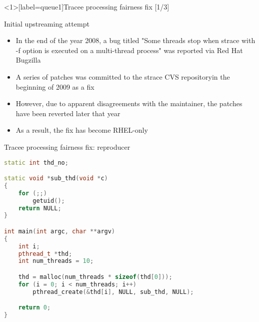 \documentclass[unicode,aspectratio=169]{beamer}
\begin{document}
\begin{frame}<1>[label=queue1]{Tracee processing fairness fix \hfill [1/3]}
\begin{block}{\large Initial upstreaming attempt}
\begin{itemize}
  \item In the end of the year 2008, a bug titled "Some threads stop when
        strace with -f option is executed on a multi-thread process"
        was reported via Red Hat Bugzilla
  \pause
  \item A series of patches was committed to the strace CVS repository\footnotemark[1]\footnotemark[2]\footnotemark[3]\footnotemark[4]
        in the beginning of 2009 as a fix
  \item However, due to apparent disagreements with the maintainer\footnotemark[5]\footnotemark[6]\footnotemark[7],
        the patches have been reverted later that year\footnotemark[8]
  \item As a result, the fix has become RHEL-only
\end{itemize}
\end{block}
\end{frame}

\begin{frame}[fragile]{Tracee processing fairness fix: reproducer}
\begin{scriptsize}
\begin{lstlisting}[language=C++,basicstyle=\ttfamily]
static int thd_no;

static void *sub_thd(void *c)
{
	for (;;)
		getuid();
	return NULL;
}

int main(int argc, char **argv)
{
	int i;
	pthread_t *thd;
	int num_threads = 10;

	thd = malloc(num_threads * sizeof(thd[0]));
	for (i = 0; i < num_threads; i++)
		pthread_create(&thd[i], NULL, sub_thd, NULL);

	return 0;
}
\end{lstlisting}
\end{scriptsize}
\end{frame}
\end{document}
